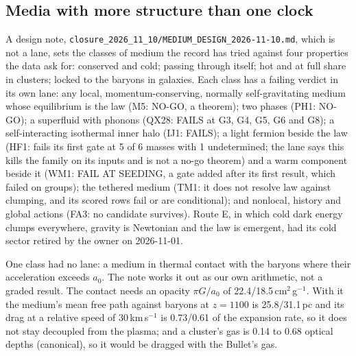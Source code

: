\documentclass[10pt]{article}
\begin{document}
\subsection{Media with more structure than one clock}
A design note, \texttt{closure\_2026\_11\_10/MEDIUM\_DESIGN\_2026-11-10.md}, which is not a lane, sets the classes of medium the record has tried against four properties the data ask for: conserved and cold; passing through itself; hot and at full share in clusters; locked to the baryons in galaxies. Each class has a failing verdict in its own lane: any local, momentum-conserving, normally self-gravitating medium whose equilibrium is the law (M5: NO-GO, a theorem); two phases (PH1: NO-GO); a superfluid with phonons (QX28: FAILS at G3, G4, G5, G6 and G8); a self-interacting isothermal inner halo (IJ1: FAILS); a light fermion beside the law (HF1: fails its first gate at 5 of 6 masses with 1 undetermined; the lane says this kills the family on its inputs and is not a no-go theorem) and a warm component beside it (WM1: FAIL AT SEEDING, a gate added after its first result, which failed on groups); the tethered medium (TM1: it does not resolve law against clumping, and its scored rows fail or are conditional); and nonlocal, history and global actions (FA3: no candidate survives). Route E, in which cold dark energy clumps everywhere, gravity is Newtonian and the law is emergent, had its cold sector retired by the owner on 2026-11-01.

One class had no lane: a medium in thermal contact with the baryons where their acceleration exceeds $a_0$. The note works it out as our own arithmetic, not a graded result. The contact needs an opacity $\pi G/a_0$ of 22.4/18.5\,cm$^2$\,g$^{-1}$. With it the medium's mean free path against baryons at $z=1100$ is 25.8/31.1\,pc and its drag at a relative speed of 30\,km\,s$^{-1}$ is 0.73/0.61 of the expansion rate, so it does not stay decoupled from the plasma; and a cluster's gas is 0.14 to 0.68 optical depths (canonical), so it would be dragged with the Bullet's gas.
\end{document}
